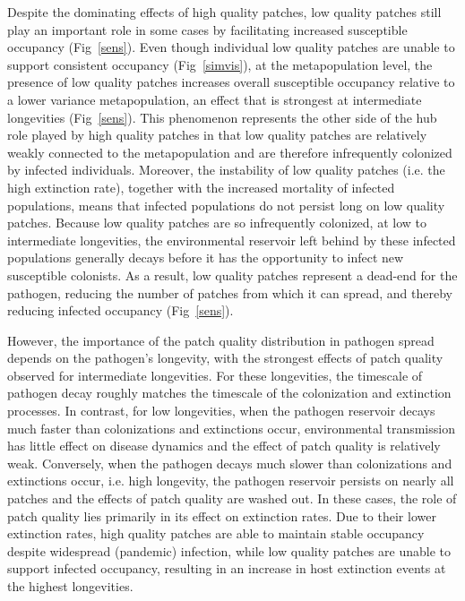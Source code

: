 \documentclass{svjour3}
\begin{document}
Despite the dominating effects of high quality patches, low quality patches still play an important role in some cases by facilitating increased susceptible occupancy (Fig~\ref{sens}). Even though individual low quality patches are unable to support consistent occupancy (Fig~\ref{simvis}), at the metapopulation level, the presence of low quality patches increases overall susceptible occupancy relative to a lower variance metapopulation, an effect that is strongest at intermediate longevities (Fig~\ref{sens}).   This phenomenon represents the other side of the hub role played by high quality patches in that low quality patches are relatively weakly connected to the metapopulation and are therefore infrequently colonized by infected individuals.  Moreover, the instability of low quality patches (i.e. the high extinction rate), together with the increased mortality of infected populations, means that infected populations do not persist long on low quality patches.  Because low quality patches are so infrequently colonized, at low to intermediate longevities, the environmental reservoir left behind by these infected populations generally decays before it has the opportunity to infect new susceptible colonists.  As a result, low quality patches represent a dead-end for the pathogen, reducing the number of patches from which it can spread, and thereby reducing infected occupancy (Fig~\ref{sens}).  

However, the importance of the patch quality distribution in pathogen spread depends on the pathogen's longevity, with the strongest effects of patch quality observed for intermediate longevities.  For these longevities, the timescale of pathogen decay roughly matches the timescale of the colonization and extinction processes.  In contrast, for low longevities, when the pathogen reservoir decays much faster than colonizations and extinctions occur, environmental transmission has little effect on disease dynamics and the effect of patch quality is relatively weak.  Conversely, when the pathogen decays much slower than colonizations and extinctions occur, i.e. high longevity, the pathogen reservoir persists on nearly all patches and the effects of patch quality are washed out.  In these cases, the role of patch quality lies primarily in its effect on extinction rates.  Due to their lower extinction rates, high quality patches are able to maintain stable occupancy despite widespread (pandemic) infection, while low quality patches are unable to support infected occupancy, resulting in an increase in host extinction events at the highest longevities.
\end{document}
